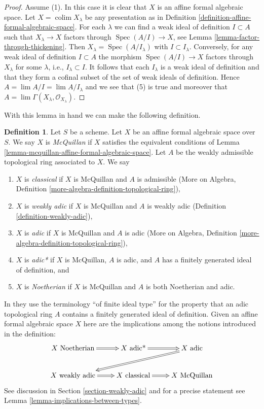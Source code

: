 \documentclass{stacks-project}
\theoremstyle{plain}
\theoremstyle{definition}
\newtheorem{definition}[subsection]{Definition}
\theoremstyle{remark}
\numberwithin{equation}{subsection}
\def\lim{\mathop{\mathrm{lim}}\nolimits}
\def\colim{\mathop{\mathrm{colim}}\nolimits}
\def\Spec{\mathop{\mathrm{Spec}}}
\begin{document}
\begin{proof}
\medskip\noindent
Assume (1). In this case it is clear that $X$ is an affine formal
algebraic space. Let $X = \colim X_\lambda$ be any presentation as in
Definition \ref{definition-affine-formal-algebraic-space}.
For each $\lambda$ we can find a weak ideal of definition
$I \subset A$ such that $X_\lambda \to X$ factors through
$\Spec(A/I) \to X$, see Lemma \ref{lemma-factor-through-thickening}.
Then $X_\lambda = \Spec(A/I_\lambda)$ with $I \subset I_\lambda$.
Conversely, for any weak ideal of definition $I \subset A$
the morphism $\Spec(A/I) \to X$ factors through $X_\lambda$
for some $\lambda$, i.e., $I_\lambda \subset I$.
It follows that each $I_\lambda$ is a weak ideal of definition
and that they form a cofinal subset of the set of weak ideals
of definition. Hence $A = \lim A/I = \lim A/I_\lambda$
and we see that (5) is true and moreover that
$A = \lim \Gamma(X_\lambda, \mathcal{O}_{X_\lambda})$.
\end{proof}

\noindent
With this lemma in hand we can make the following definition.

\begin{definition}
\label{definition-types-affine-formal-algebraic-space}
Let $S$ be a scheme. Let $X$ be an affine formal algebraic space over $S$.
We say $X$ is {\it McQuillan} if $X$ satisfies the equivalent conditions
of Lemma \ref{lemma-mcquillan-affine-formal-algebraic-space}. Let $A$
be the weakly admissible topological ring associated to $X$. We say
\begin{enumerate}
\item $X$ is {\it classical} if $X$ is McQuillan and $A$ is admissible
(More on Algebra, Definition \ref{more-algebra-definition-topological-ring}),
\item $X$ is {\it weakly adic} if $X$ is McQuillan and $A$ is weakly adic
(Definition \ref{definition-weakly-adic}),
\item $X$ is {\it adic} if $X$ is McQuillan and $A$ is adic
(More on Algebra, Definition \ref{more-algebra-definition-topological-ring}),
\item $X$ is {\it adic*} if $X$ is McQuillan, $A$ is adic, and $A$
has a finitely generated ideal of definition, and
\item $X$ is {\it Noetherian} if $X$ is McQuillan and $A$ is
both Noetherian and adic.
\end{enumerate}
\end{definition}

\noindent
In \cite{Fujiwara-Kato} they use the terminology ``of finite ideal type''
for the property that an adic topological ring $A$ contains a finitely
generated ideal of definition. Given an affine formal algebraic space $X$
here are the implications among the notions introduced in the definition:
$$
\xymatrix{
X\text{ Noetherian} \ar@{=>}[r] &
X\text{ adic*} \ar@{=>}[r] &
X\text{ adic} \ar@{=>}[lld] \\
X\text{ weakly adic} \ar@{=>}[r] &
X\text{ classical} \ar@{=>}[r] &
X\text{ McQuillan}
}
$$
See discussion in Section \ref{section-weakly-adic} and for a precise statement
see Lemma \ref{lemma-implications-between-types}.
\end{document}
